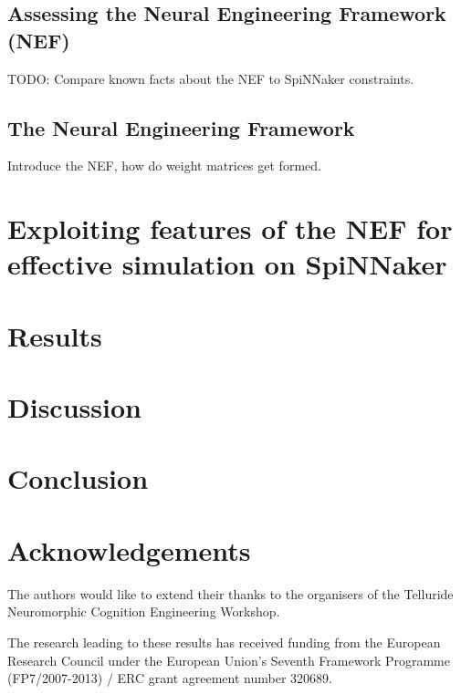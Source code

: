\documentclass[conference]{IEEEtran}
\begin{document}
  \subsection{Assessing the Neural Engineering Framework (NEF)}

  TODO: Compare known facts about the NEF to SpiNNaker constraints.

  \subsection{The Neural Engineering Framework}

  Introduce the NEF, how do weight matrices get formed.

  \section{Exploiting features of the NEF for effective simulation on
           SpiNNaker}
  
  \section{Results}

  \section{Discussion}

  \section{Conclusion}
  
  \section*{Acknowledgements}

  The authors would like to extend their thanks to the organisers of the
  Telluride Neuromorphic Cognition Engineering Workshop.

  The research leading to these results has received funding from the European
  Research Council under the European Union’s Seventh Framework Programme
  (FP7/2007-2013) / ERC grant agreement number 320689.

  \printbibliography
\end{document}

